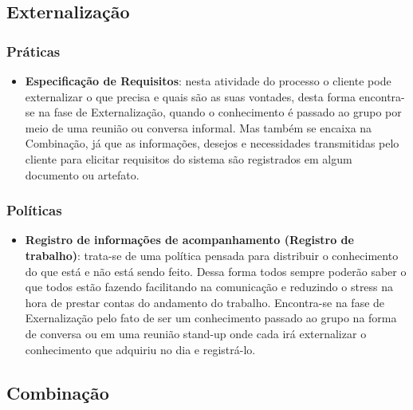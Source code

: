 \subsection{Externalização}
\subsubsection{Práticas}
\begin{itemize}
\item \textbf{Especificação de Requisitos}:  nesta atividade do processo o cliente pode externalizar o que precisa e quais são as suas vontades, desta forma encontra-se na fase de Externalização, quando o conhecimento é passado ao grupo por meio de uma reunião ou conversa informal. Mas também se encaixa na Combinação, já que as informações, desejos e necessidades transmitidas pelo cliente para elicitar requisitos do sistema são registrados em algum documento ou artefato. 
\end{itemize}

\subsubsection{Políticas}
\begin{itemize}
\item \textbf{Registro de informações de acompanhamento (Registro de trabalho)}: trata-se de uma política pensada para distribuir o conhecimento do que está e não está sendo feito. Dessa forma todos sempre poderão saber o que todos estão fazendo facilitando na comunicação e reduzindo o stress na hora de prestar contas do andamento do trabalho. Encontra-se na fase de Exernalização pelo fato de ser um conhecimento passado ao grupo na forma de conversa ou em uma reunião stand-up onde cada irá externalizar o conhecimento que adquiriu no dia e registrá-lo.
\end{itemize}

\subsection{Combinação}
